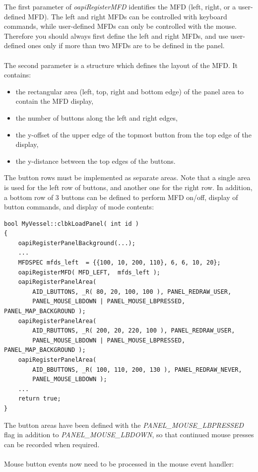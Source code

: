 \documentclass[Orbiter Developer Manual.tex]{subfiles}
\begin{document}
\noindent
The first parameter of \textit{oapiRegisterMFD} identifies the MFD (left, right, or a user-defined MFD). The left and right MFDs can be controlled with keyboard commands, while user-defined MFDs can only be controlled with the mouse. Therefore you should always first define the left and right MFDs, and use user-defined ones only if more than two MFDs are to be defined in the panel.\\
\\
The second parameter is a structure which defines the layout of the MFD. It contains:

\begin{itemize}
\item the rectangular area (left, top, right and bottom edge) of the panel area to contain the MFD display,
\item the number of buttons along the left and right edges,
\item the y-offset of the upper edge of the topmost button from the top edge of the display,
\item the y-distance between the top edges of the buttons.
\end{itemize}

\noindent
The button rows must be implemented as separate areas. Note that a single area is used for the left row of buttons, and another one for the right row. In addition, a bottom row of 3 buttons can be defined to perform MFD on/off, display of button commands, and display of mode contents:

\begin{lstlisting}
bool MyVessel::clbkLoadPanel( int id )
{
	oapiRegisterPanelBackground(...);
	...
	MFDSPEC mfds_left  = {{100, 10, 200, 110}, 6, 6, 10, 20};
	oapiRegisterMFD( MFD_LEFT,  mfds_left );
	oapiRegisterPanelArea(
		AID_LBUTTONS, _R( 80, 20, 100, 100 ), PANEL_REDRAW_USER,
		PANEL_MOUSE_LBDOWN | PANEL_MOUSE_LBPRESSED, PANEL_MAP_BACKGROUND );
	oapiRegisterPanelArea(
		AID_RBUTTONS, _R( 200, 20, 220, 100 ), PANEL_REDRAW_USER,
		PANEL_MOUSE_LBDOWN | PANEL_MOUSE_LBPRESSED, PANEL_MAP_BACKGROUND );
	oapiRegisterPanelArea(
		AID_BBUTTONS, _R( 100, 110, 200, 130 ), PANEL_REDRAW_NEVER,
		PANEL_MOUSE_LBDOWN );
	...
	return true;
}
\end{lstlisting}

\noindent
The button areas have been defined with the \textit{PANEL\_MOUSE\_LBPRESSED} flag in addition to \textit{PANEL\-\_MOUSE\_LBDOWN}, so that continued mouse presses can be recorded when required.\\
\\
Mouse button events now need to be processed in the mouse event handler:
\end{document}
